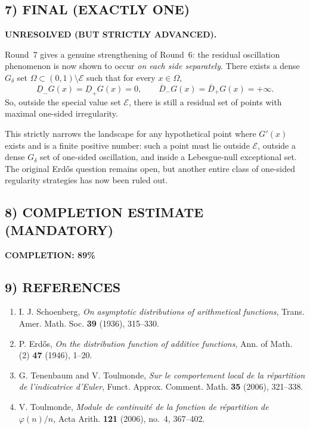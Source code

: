 \subsection{7) FINAL (EXACTLY ONE)}

\textbf{UNRESOLVED (BUT STRICTLY ADVANCED).}

Round~7 gives a genuine strengthening of Round~6: the residual oscillation phenomenon is now shown to occur \emph{on each side separately}.
There exists a dense $G_\delta$ set $\Omega\subset(0,1)\setminus\mathcal E$ such that for every $x\in\Omega$,
\[
\underline D_-G(x)=\underline D_+G(x)=0,
\qquad
\overline D_-G(x)=\overline D_+G(x)=+\infty.
\]
So, outside the special value set $\mathcal E$, there is still a residual set of points with maximal one-sided irregularity.

This strictly narrows the landscape for any hypothetical point where $G'(x)$ exists and is a finite positive number:
such a point must lie outside $\mathcal E$, outside a dense $G_\delta$ set of one-sided oscillation, and inside a Lebesgue-null exceptional set.
The original Erd\H{o}s question remains open, but another entire class of one-sided regularity strategies has now been ruled out.

\subsection{8) COMPLETION ESTIMATE (MANDATORY)}

\textbf{COMPLETION: 89\%}

\subsection{9) REFERENCES}

\begin{enumerate}
\item I. J. Schoenberg, \emph{On asymptotic distributions of arithmetical functions}, Trans. Amer. Math. Soc. \textbf{39} (1936), 315--330.
\item P. Erd\H{o}s, \emph{On the distribution function of additive functions}, Ann. of Math. (2) \textbf{47} (1946), 1--20.
\item G. Tenenbaum and V. Toulmonde, \emph{Sur le comportement local de la r\'epartition de l'indicatrice d'Euler}, Funct. Approx. Comment. Math. \textbf{35} (2006), 321--338.
\item V. Toulmonde, \emph{Module de continuit\'e de la fonction de r\'epartition de $\varphi(n)/n$}, Acta Arith. \textbf{121} (2006), no.~4, 367--402.
\end{enumerate}
